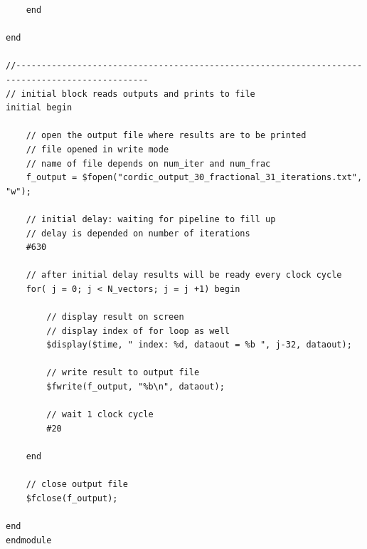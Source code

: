 \documentclass{article}
\begin{document}
\begin{verbatim}
    end

end

//------------------------------------------------------------------------------------------------
// initial block reads outputs and prints to file
initial begin 
    
    // open the output file where results are to be printed
    // file opened in write mode
    // name of file depends on num_iter and num_frac
    f_output = $fopen("cordic_output_30_fractional_31_iterations.txt", "w");
    
    // initial delay: waiting for pipeline to fill up
    // delay is depended on number of iterations
    #630
    
    // after initial delay results will be ready every clock cycle
    for( j = 0; j < N_vectors; j = j +1) begin
    
        // display result on screen
        // display index of for loop as well
        $display($time, " index: %d, dataout = %b ", j-32, dataout);
        
        // write result to output file
        $fwrite(f_output, "%b\n", dataout);
        
        // wait 1 clock cycle
        #20
        
    end
    
    // close output file
    $fclose(f_output);
    
end
endmodule
\end{verbatim}
\label{lst:test_bench}
\end{document}
